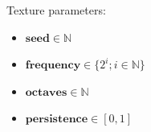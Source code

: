 \documentclass[10pt,a4paper]{article}
\begin{document}
\bigskip
Texture parameters:
\begin{itemize}
\item $\mathbf{seed} \in \mathbb{N}$
\item $\mathbf{frequency} \in \{ 2^i; i \in \mathbb{N}\}$
\item $\mathbf{octaves} \in \mathbb{N}$
\item $\mathbf{persistence} \in [0,1]$
\end{itemize}


\end{document}
